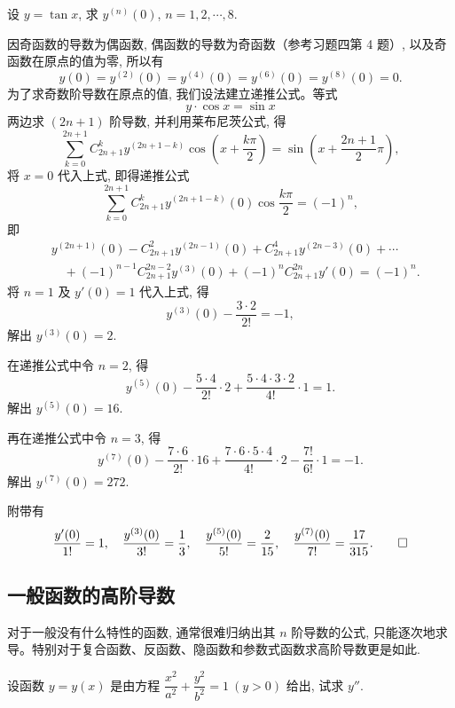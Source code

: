 \begin{example}\label{example:ma-4-4-7}
设 $y=\tan x$, 求 $y^{(n)}(0)$, $n=1,2,\cdots,8$.
\end{example}


\begin{solve}
因奇函数的导数为偶函数, 偶函数的导数为奇函数（参考习题四第 4 题）, 以及奇函数在原点的值为零, 所以有
\[
  y(0)=y^{(2)}(0)=y^{(4)}(0)=y^{(6)}(0)=y^{(8)}(0)=0.
\]
为了求奇数阶导数在原点的值, 我们设法建立递推公式。等式
\[
  y\cdot\cos x=\sin x
\]
两边求 $(2n+1)$ 阶导数, 并利用莱布尼茨公式, 得
\[
  \sum_{k=0}^{2n+1}
  C_{2n+1}^ky^{(2n+1-k)}
  \cos\left(x+\frac{k\pi}{2}\right)
  =
  \sin\left(x+\frac{2n+1}{2}\pi\right),
\]
将 $x=0$ 代入上式, 即得递推公式
\[
  \sum_{k=0}^{2n+1}
  C_{2n+1}^ky^{(2n+1-k)}(0)\cos\frac{k\pi}{2}
  =
  (-1)^n,
\]
即
\[
\begin{aligned}
  &y^{(2n+1)}(0)
  -C_{2n+1}^{2}y^{(2n-1)}(0)
  +C_{2n+1}^{4}y^{(2n-3)}(0)+\cdots \\
  &\quad
  +(-1)^{n-1}C_{2n+1}^{2n-2}y^{(3)}(0)
  +(-1)^nC_{2n+1}^{2n}y'(0)
  =
  (-1)^n.
\end{aligned}
\]
将 $n=1$ 及 $y'(0)=1$ 代入上式, 得
\[
  y^{(3)}(0)-\frac{3\cdot2}{2!}=-1,
\]
解出 $y^{(3)}(0)=2$.

在递推公式中令 $n=2$, 得
\[
  y^{(5)}(0)-\frac{5\cdot4}{2!}\cdot2
  +
  \frac{5\cdot4\cdot3\cdot2}{4!}\cdot1
  =
  1.
\]
解出 $y^{(5)}(0)=16$.

再在递推公式中令 $n=3$, 得
\[
  y^{(7)}(0)-\frac{7\cdot6}{2!}\cdot16
  +
  \frac{7\cdot6\cdot5\cdot4}{4!}\cdot2
  -
  \frac{7!}{6!}\cdot1
  =
  -1.
\]
解出 $y^{(7)}(0)=272$.

附带有
\[
  \frac{y'(0)}{1!}=1,\quad
  \frac{y^{(3)}(0)}{3!}=\frac13,\quad
  \frac{y^{(5)}(0)}{5!}=\frac{2}{15},\quad
  \frac{y^{(7)}(0)}{7!}=\frac{17}{315}.
\qedhere
\]
\end{solve}


\subsection{一般函数的高阶导数}
\label{subsec:ma-4-4-3}

对于一般没有什么特性的函数, 通常很难归纳出其 $n$ 阶导数的公式, 只能逐次地求导。特别对于复合函数、反函数、隐函数和参数式函数求高阶导数更是如此.

\begin{example}\label{example:ma-4-4-8}
设函数 $y=y(x)$ 是由方程 $\dfrac{x^2}{a^2}+\dfrac{y^2}{b^2}=1\ (y>0)$ 给出, 试求 $y''$.
\end{example}


